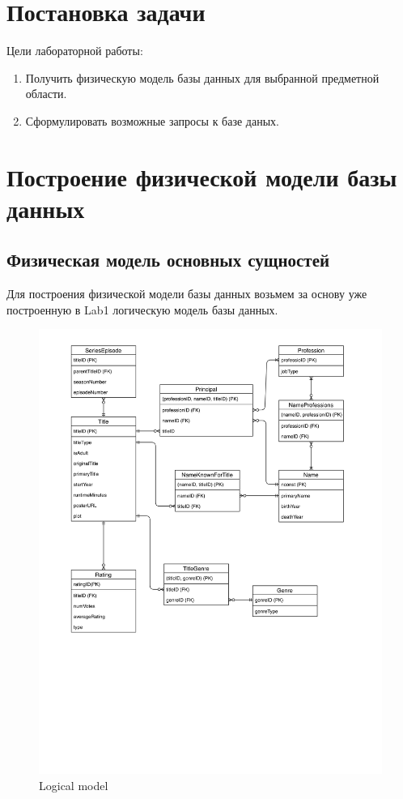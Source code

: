 \documentclass[12pt,a4paper]{article}
\begin{document}
\section{Постановка задачи}
Цели лабораторной работы:
\begin{enumerate}
    \item Получить физическую модель базы данных для выбранной предметной области.
    \item Сформулировать возможные запросы к базе даных.
\end{enumerate}
\section{Построение физической модели базы данных}
\subsection{Физическая модель основных сущностей}
Для построения физической модели базы данных возьмем за основу уже построенную в Lab1 логическую модель базы данных. \par
\begin{figure}[ht]
    \includegraphics[width=\linewidth]{images/Lab1/logical_model.jpg}
    \caption{Logical model}
    \label{fig:Logical model}
\end{figure}
\end{document}
